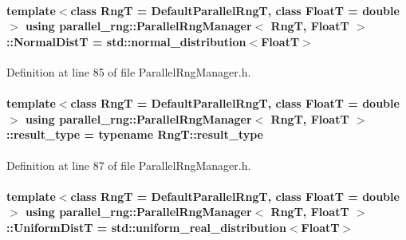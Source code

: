 \hypertarget{classparallel__rng_1_1ParallelRngManager_a8eebc9754ce2a75faeca6b9736d2872f}{
\paragraph[{Normal\-Dist\-T}]{\setlength{\rightskip}{0pt plus 5cm}template$<$class Rng\-T  = Default\-Parallel\-Rng\-T, class Float\-T  = double$>$ using {\bf parallel\-\_\-rng\-::\-Parallel\-Rng\-Manager}$<$ Rng\-T, Float\-T $>$\-::{\bf Normal\-Dist\-T} =  std\-::normal\-\_\-distribution$<$Float\-T$>$}}\label{classparallel__rng_1_1ParallelRngManager_a8eebc9754ce2a75faeca6b9736d2872f}


Definition at line 85 of file Parallel\-Rng\-Manager.\-h.

\hypertarget{classparallel__rng_1_1ParallelRngManager_a199ad0d83c322a1f4415280002dcb386}{
\paragraph[{result\-\_\-type}]{\setlength{\rightskip}{0pt plus 5cm}template$<$class Rng\-T  = Default\-Parallel\-Rng\-T, class Float\-T  = double$>$ using {\bf parallel\-\_\-rng\-::\-Parallel\-Rng\-Manager}$<$ Rng\-T, Float\-T $>$\-::{\bf result\-\_\-type} =  typename Rng\-T\-::result\-\_\-type}}\label{classparallel__rng_1_1ParallelRngManager_a199ad0d83c322a1f4415280002dcb386}


Definition at line 87 of file Parallel\-Rng\-Manager.\-h.

\hypertarget{classparallel__rng_1_1ParallelRngManager_a5df9dbb440b976fbc769d564dfccb597}{
\paragraph[{Uniform\-Dist\-T}]{\setlength{\rightskip}{0pt plus 5cm}template$<$class Rng\-T  = Default\-Parallel\-Rng\-T, class Float\-T  = double$>$ using {\bf parallel\-\_\-rng\-::\-Parallel\-Rng\-Manager}$<$ Rng\-T, Float\-T $>$\-::{\bf Uniform\-Dist\-T} =  std\-::uniform\-\_\-real\-\_\-distribution$<$Float\-T$>$}}\label{classparallel__rng_1_1ParallelRngManager_a5df9dbb440b976fbc769d564dfccb597}


